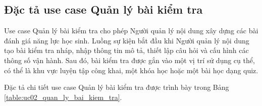 ﻿\documentclass[../DoAn.tex]{subfiles}
\begin{document}
\subsection{Đặc tả use case Quản lý bài kiểm tra}
\label{subsection:2.3.2}

Use case Quản lý bài kiểm tra cho phép Người quản lý nội dung xây dựng các bài đánh giá năng lực học sinh. Luồng sự kiện bắt đầu khi Người quản lý nội dung tạo bài kiểm tra nháp, nhập thông tin mô tả, thiết lập câu hỏi và cấu hình các thông số vận hành. Sau đó, bài kiểm tra được gắn vào một vị trí sử dụng cụ thể, có thể là khu vực luyện tập công khai, một khóa học hoặc một bài học dạng quiz.

Đặc tả chi tiết use case Quản lý bài kiểm tra được trình bày trong Bảng \ref{table:uc02_quan_ly_bai_kiem_tra}.

\begingroup
\small
\renewcommand{\arraystretch}{1.15}
\setlength{\LTpre}{0pt}
\setlength{\LTpost}{0pt}
\end{document}
